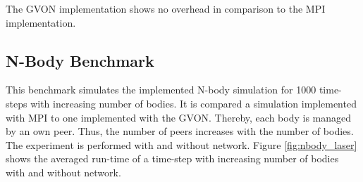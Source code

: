 The GVON implementation shows no overhead in comparison to the MPI
implementation.


\subsection{N-Body Benchmark}
This benchmark simulates the implemented N-body simulation for 1000
time-steps with increasing number of bodies. It is compared a
simulation implemented with MPI to one implemented with the GVON.
Thereby, each body is managed by an own peer. Thus, the number of
peers increases with the number of bodies. The experiment is performed
with and without network. Figure \ref{fig:nbody_laser} shows the
averaged run-time of a time-step with increasing number of bodies with
and without network.

